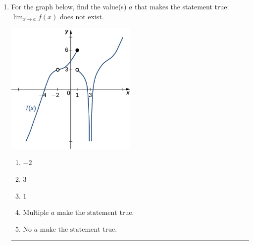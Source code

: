 \documentclass[14pt]{extbook}
\newcommand{\litem}[1]{\item#1\hspace*{-1cm}\rule{\textwidth}{0.4pt}}
\begin{document}
\begin{enumerate}
{\begin{enumerate}[label=\Alph*.]
\end{enumerate} }
\litem{
For the graph below, find the value(s) $a$ that makes the statement true: $ \displaystyle \lim_{x \rightarrow a} f(x)$ does not exist.
\begin{center}
    \includegraphics[width=0.5\textwidth]{../Figures/evaluateLimitGraphicallyCopyB.png}
\end{center}
\begin{enumerate}[label=\Alph*.]
\item \( -2 \)
\item \( 3 \)
\item \( 1 \)
\item \( \text{Multiple } a \text{ make the statement true}. \)
\item \( \text{No } a \text{ make the statement true}. \)

\end{enumerate} }
\end{enumerate}
\end{document}
